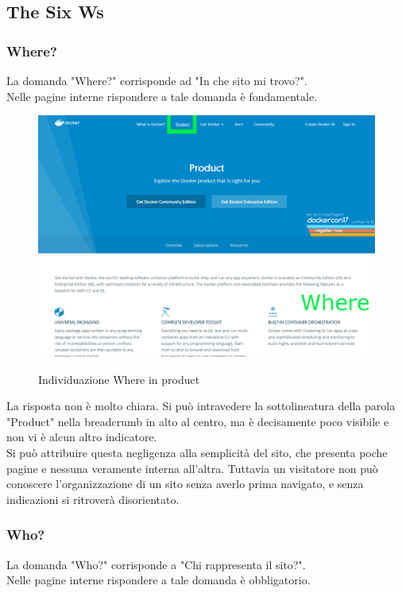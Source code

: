 \documentclass[a4paper]{article}
\begin{document}
\subsection{The Six Ws}

\subsubsection{Where?}
La domanda "Where?" corrisponde ad "In che sito mi trovo?".
\\
Nelle pagine interne rispondere a tale domanda è fondamentale.

\begin{figure}[H]
	\centering
	\includegraphics[width=\linewidth]{images/productwhere.png}
    \label{fig:productwhere}
    \caption{Individuazione Where in product}
\end{figure}

\noindent La risposta non è molto chiara. Si può intravedere la sottolineatura della parola "Product" nella breadcrumb in alto al centro, ma è decisamente poco visibile e non vi è alcun altro indicatore.
\\
Si può attribuire questa negligenza alla semplicità del sito, che presenta poche pagine e nessuna veramente interna all'altra. Tuttavia un visitatore non può conoscere l'organizzazione di un sito senza averlo prima navigato, e senza indicazioni si ritroverà disorientato.

\newpage
\subsubsection{Who?}
La domanda "Who?" corrisponde a "Chi rappresenta il sito?".
\\
Nelle pagine interne rispondere a tale domanda è obbligatorio.
\end{document}
